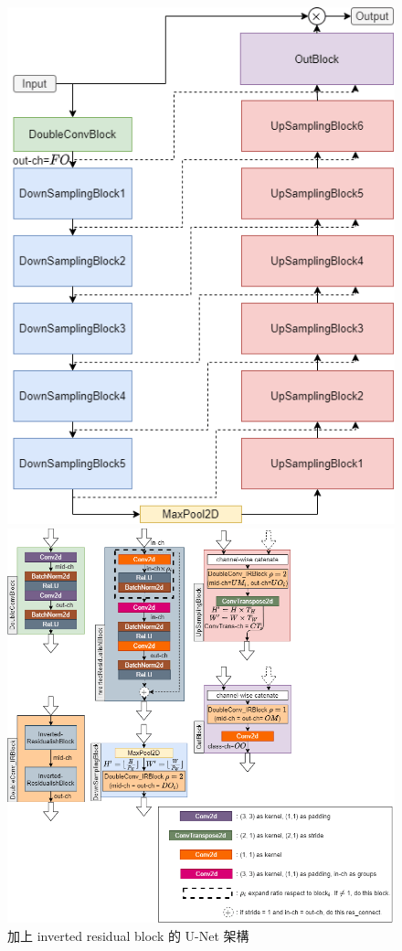 \begin{figure}[htbp]
\begin{minipage}[t]{0.3\textwidth}
      \centering
        \includegraphics[width=\textwidth]{./figures/chapter04_experiment/MobileUnetV2_1.png}
        \caption {加上 inverted residual block 的 U-Net 架構}
        \label{MobileUnetV2_1}
    \end{minipage}
    \begin{minipage}[t]{0.6\textwidth}
        \centering
        \includegraphics[width=\textwidth]{./figures/chapter04_experiment/MobileUnetV2_2.png}

\end{minipage}
\end{figure}
